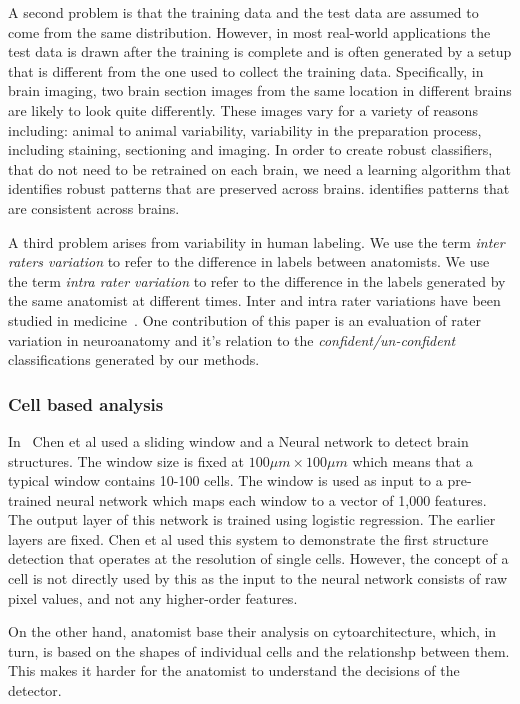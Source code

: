 \documentclass[11pt]{article}
\begin{document}
A second problem is that the training data and the test data are assumed to
come from the same distribution. However, in most real-world
applications the test data is drawn after the training is complete and
is often generated by a setup that is different from the one used to
collect the training data.
Specifically, in brain imaging, two brain section images from the same
location in different brains are likely to look quite differently.
These images vary for a variety of reasons including: animal to animal variability,
variability in the preparation process, including staining,
sectioning and imaging. In order to create robust classifiers, that do
not need to be retrained on each brain, we need a learning algorithm
that identifies robust patterns that are preserved across brains.
identifies patterns that are consistent across brains.

A third problem arises from variability in human labeling. We use
the term {\em inter raters variation} to refer to the difference in
labels between anatomists. We use the term {\em intra rater
  variation} to refer to the difference in the labels generated by the
same anatomist at different times. Inter and intra rater variations
have been studied in medicine~\cite{gellhorn2013inter}. One
contribution of this paper is an evaluation of rater variation in
neuroanatomy and it's relation to the {\em confident/un-confident}
classifications generated by our methods.
\fi

\iffalse
\subsubsection{Cell based analysis}

In~\cite{chen2019active} Chen et al used a sliding window and a
Neural network to detect brain structures. The window size is fixed at
$100 \mu m \times 100 \mu m$ which means that a typical window contains 10-100 cells.
The window is used as input to a pre-trained neural network which maps
each window to a vector of 1,000 features. The output layer of
this network is trained using logistic regression. The earlier layers
are fixed. Chen et al used this system to demonstrate the first
structure detection that operates at the resolution of single cells.
However, the concept of a cell is not directly used by this as the
input to the neural network consists of raw pixel values, and not any
higher-order features.

On the other hand, anatomist base their analysis on cytoarchitecture,
which, in turn, is based on the shapes of individual cells and the
relationshp between them. This makes it harder for the anatomist to
understand the decisions of the detector.
\end{document}

